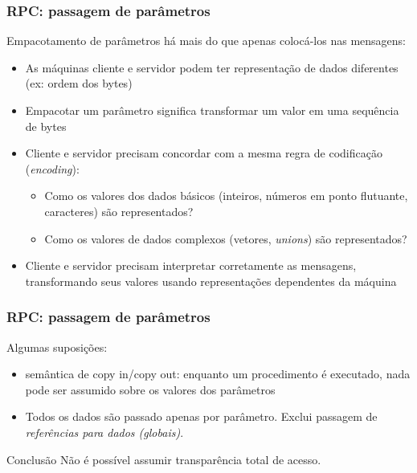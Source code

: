 \documentclass[Ligatures=TeX,table,brazil,svgnames,usetotalslideindicator,compress,10pt]{beamer}
\begin{document}
\begin{frame}
  \frametitle{RPC: passagem de parâmetros}

  \begin{block}{Empacotamento de parâmetros} há mais do que apenas colocá-los nas mensagens:

    \begin{itemize}
    \item As máquinas cliente e servidor podem ter \alert{representação de dados diferentes} (ex: ordem dos bytes)
    \item Empacotar um parâmetro significa \alert{transformar um valor em uma sequência de bytes}
    \item Cliente e servidor precisam concordar com a mesma regra de codificação (\textit{encoding}):
      \begin{itemize}
      \item Como os \alert{valores dos dados básicos} (inteiros, números em ponto flutuante, caracteres) são representados?
      \item Como os \alert{valores de dados complexos} (vetores, \textit{unions}) são representados?
      \end{itemize}

      \item Cliente e servidor precisam \alert{interpretar corretamente as mensagens}, transformando seus valores usando representações dependentes da máquina
    \end{itemize}
  \end{block}
\end{frame}

\begin{frame}
  \frametitle{RPC: passagem de parâmetros}
  \begin{block}{Algumas suposições:}
    \begin{itemize}
    \item semântica de \alert{copy in/copy out}: enquanto um procedimento é executado, nada pode ser assumido sobre os valores dos parâmetros
    \item \alert{Todos} os dados são passado apenas por parâmetro. Exclui passagem de \emph{referências para dados (globais)}.
    \end{itemize}
  \end{block}

  \pause
  \begin{alertblock}{Conclusão}
    Não é possível assumir transparência total de acesso.
  \end{alertblock}

\end{frame}
\end{document}
